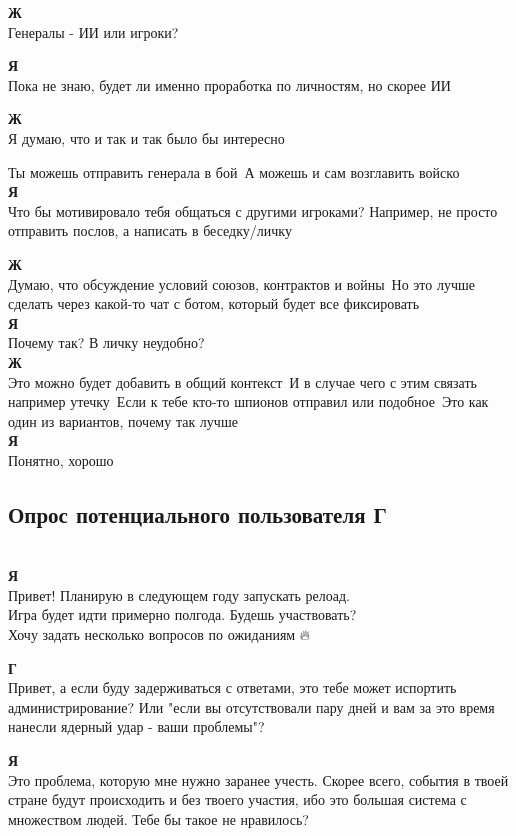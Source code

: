 \textbf{Ж}\\
Генералы - ИИ или игроки?

\textbf{Я}\\
Пока не знаю, будет ли именно проработка по личностям, но скорее ИИ

\textbf{Ж}\\
Я думаю, что и так и так было бы интересно

Ты можешь отправить генерала в бой\
А можешь и сам возглавить войско\\

\textbf{Я}\\
Что бы мотивировало тебя общаться с другими игроками? Например, не просто отправить послов, а написать в беседку/личку

\textbf{Ж}\\
Думаю, что обсуждение условий союзов, контрактов и войны\
Но это лучше сделать через какой-то чат с ботом, который будет все фиксировать\\

\textbf{Я}\\
Почему так? В личку неудобно?\\

\textbf{Ж}\\
Это можно будет добавить в общий контекст\
И в случае чего с этим связать например утечку\
Если к тебе кто-то шпионов отправил или подобное\
Это как один из вариантов, почему так лучше\\

\textbf{Я}\\
Понятно, хорошо

\subsection*{Опрос потенциального пользователя Г}\\
\textbf{Я}\\
Привет! Планирую в следующем году запускать релоад.\\
Игра будет идти примерно полгода. Будешь участвовать?\\
Хочу задать несколько вопросов по ожиданиям 🔥🎅

\textbf{Г}\\
Привет, а если буду задерживаться с ответами, это тебе может испортить администрирование? Или "если вы отсутствовали пару дней и вам за это время нанесли ядерный удар - ваши проблемы"?

\textbf{Я}\\
Это проблема, которую мне нужно заранее учесть. Скорее всего, события в твоей стране будут происходить и без твоего участия, ибо это большая система с множеством людей. Тебе бы такое не нравилось?

